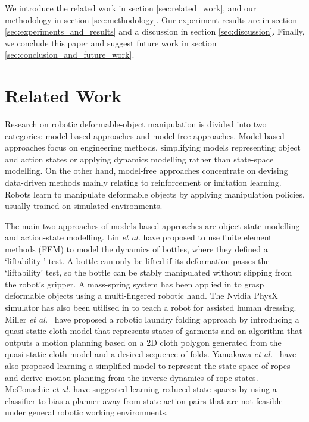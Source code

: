 \documentclass[conference]{IEEEtran}
\begin{document}
We introduce the related work in section \ref{sec:related_work}, and our methodology in section \ref{sec:methodology}. Our experiment results are in section \ref{sec:experiments_and_results} and a discussion in section \ref{sec:discussion}. Finally, we conclude this paper and suggest future work in section \ref{sec:conclusion_and_future_work}.

\section{Related Work \label{sec:related_work}}
Research on robotic deformable-object manipulation is divided into two categories: model-based approaches and model-free approaches. Model-based approaches focus on engineering methods, simplifying models representing object and action states or applying dynamics modelling rather than state-space modelling. On the other hand, model-free approaches concentrate on devising data-driven methods mainly relating to reinforcement or imitation learning. Robots learn to manipulate deformable objects by applying manipulation policies, usually trained on simulated environments.

The main two approaches of models-based approaches are object-state modelling and action-state modelling. Lin \textit{et al.} \cite{lin2015picking} have proposed to use finite element methods (FEM) to model the dynamics of bottles, where they defined a ‘liftability ’ test. A bottle can only be lifted if its deformation passes the ‘liftability’ test, so the bottle can be stably manipulated without slipping from the robot's gripper. A mass-spring system has been applied in \cite{zaidi2017model} to grasp deformable objects using a multi-fingered robotic hand. The Nvidia PhysX simulator has also been utilised in \cite{yu2017haptic} to teach a robot for assisted human dressing. Miller \textit{et al.}~\cite{miller2012geometric} have proposed a robotic laundry folding approach by introducing a quasi-static cloth model that represents states of garments and an algorithm that outputs a motion planning based on a 2D cloth polygon generated from the quasi-static cloth model and a desired sequence of folds. Yamakawa \textit{et al.}~\cite{yamakawa2012simple} have also proposed learning a simplified model to represent the state space of ropes and derive motion planning from the inverse dynamics of rope states. McConachie \textit{et al.}\cite{mcconachie2020learning} have suggested learning reduced state spaces by using a classifier to bias a planner away from state-action pairs that are not feasible under general robotic working environments.
\end{document}
